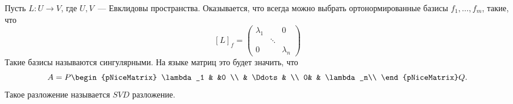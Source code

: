 Пусть $L\colon U \to V$, где $U, V$~--- Евклидовы пространства.
Оказывается, что всегда можно выбрать ортонормированные базисы  $f_1,\dots, f_m$,
такие, что
\[
    [L]_f = 
    \begin{pmatrix}
        \lambda_1 & & 0\\
        & \ddots & \\
        0 & & \lambda_n
    \end{pmatrix}
\] 
Такие базисы называются сингулярными.
На языке матриц это будет значить, что
\[
    A = P 
    \begin{pNiceMatrix}
        \lambda_1 & &0 \\
          & \Ddots & \\
        0& & \lambda_n\\
    \end{pNiceMatrix} Q
.\]
Такое разложение называется $SVD$ разложение.
